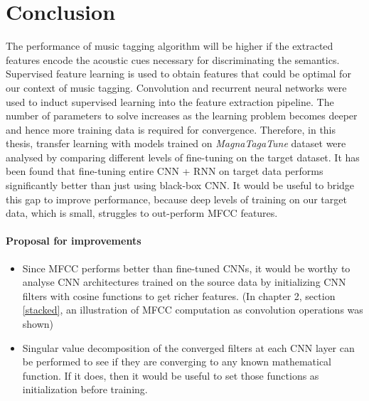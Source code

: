 

\chapter{Conclusion} %

\label{Chapter5}
The performance of music tagging algorithm will be higher if the extracted features encode the acoustic cues necessary for discriminating the semantics. Supervised feature learning is used to obtain features that could be optimal for our context of music tagging. Convolution and recurrent neural networks were used to induct supervised learning into the feature extraction pipeline. The number of parameters to solve increases as the learning problem becomes deeper and hence more training data is required for convergence. Therefore, in this thesis, transfer learning with models trained on \textit{MagnaTagaTune} dataset were analysed by comparing different levels of fine-tuning on the target dataset. It has been found that fine-tuning entire CNN + RNN on target data performs significantly better than just using black-box CNN. It would be useful to bridge this gap to improve performance, because deep levels of training on our target data, which is small, struggles to out-perform MFCC features.     

\subsubsection{Proposal for improvements}
\begin{itemize}
\setlength\itemsep{0em}
\item Since MFCC performs better than fine-tuned CNNs, it would be worthy to analyse CNN architectures trained on the source data by initializing CNN filters with cosine functions to get richer features. (In chapter 2, section \ref{stacked}, an illustration of MFCC computation as convolution operations was shown)
\item Singular value decomposition of the converged filters at each CNN layer can be performed to see if they are converging to any known mathematical function. If it does, then it would be useful to set those functions as initialization before training.   
\end{itemize}
 

